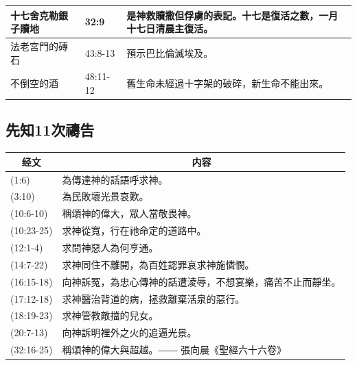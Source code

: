 \begin{table}[H]
\begin{tabular}{p{3.5cm}|p{2.50cm}|p{11.0cm}}
十七舍克勒銀子贖地&32:9&是神救贖撒但俘虜的表記。十七是復活之數，一月十七日清晨主復活。\\\hline
法老宮門的磚石&43:8-13&預示巴比倫滅埃及。\\\hline
不倒空的酒&48:11-12&舊生命未經過十字架的破碎，新生命不能出來。\\\hline
\end{tabular}
\end{table}

\subsection{先知11次禱告}
\begin{table}[H]
\centering
\begin{tabular}{p{}|p{10.50cm}}\hline\hline
\multicolumn{1}{c|}{经文}&\multicolumn{1}{c}{内容}\\\hline
 (1:6)&為傳達神的話語呼求神。\\\hline
 (3:10)&為民敗壞光景哀歎。\\\hline
 (10:6-10)&稱頌神的偉大，眾人當敬畏神。\\\hline
 (10:23-25)&求神從寬，行在祂命定的道路中。\\\hline
 (12:1-4)&求問神惡人為何亨通。\\\hline
 (14:7-22)&求神同住不離開，為百姓認罪哀求神施憐憫。\\\hline
 (16:15-18)&向神訴冤，為忠心傳神的話遭淩辱，不想宴樂，痛苦不止而靜坐。\\\hline
 (17:12-18)&求神醫治背道的病，拯救離棄活泉的惡行。\\\hline
 (18:19-23)&求神管教敵擋的兒女。\\\hline
 (20:7-13)&向神訴明裡外之火的追逼光景。\\\hline
 (32:16-25)&稱頌神的偉大與超越。―― 張向晨《聖經六十六卷》 
\\\hline
\end{tabular}
\end{table}



